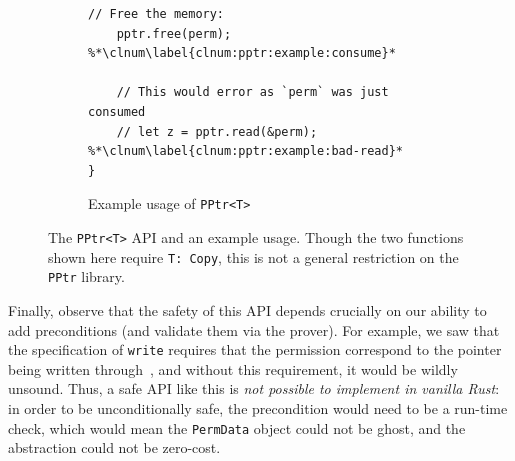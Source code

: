 \begin{figure}
\begin{subfigure}[c]{.50\textwidth}
\begin{lstlisting}[language=Verus,style=VerusLineNos]
    // Free the memory:
    pptr.free(perm); %*\clnum\label{clnum:pptr:example:consume}*

    // This would error as `perm` was just consumed 
    // let z = pptr.read(&perm); %*\clnum\label{clnum:pptr:example:bad-read}*
}
\end{lstlisting}
\caption{Example usage of \texttt{PPtr<T>}} \label{fig:pptr:ex}
\end{subfigure}
    \caption{
        \label{fig:pptr}
        The \texttt{PPtr<T>} API and an example usage.
        Though the two functions shown here require \texttt{T: Copy}, this is not a general
        restriction on the \texttt{PPtr} library.
    }
\end{figure}


Finally, observe that the safety of this API depends crucially on our ability to add
preconditions (and validate them via the prover).
For example, we saw that the specification of \verb`write` requires that the permission correspond to
the pointer being written through~, and without this requirement,
it would be wildly unsound.
Thus, a safe API like this is \emph{not possible to implement in vanilla Rust}:
in order to be unconditionally safe,
the precondition would need to be a run-time check,
which would mean the \verb`PermData` object could not be ghost, and the abstraction
could not be zero-cost.



